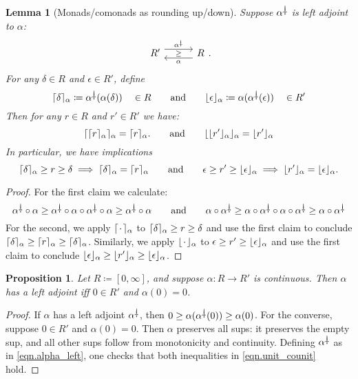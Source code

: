 \documentclass[11pt, one side, article]{memoir}
\newcommand{\adjpos}[6][30pt]{%
\begin{tikzcd}[ampersand replacement=\&, column sep=#1]
  #2\ar[r, shift left=4.5pt, "#3"]
  \ar[r, phantom, "\scriptstyle#6"]\&
  #5\ar[l, shift left=4.5pt, "#4"]
\end{tikzcd}
}
\theoremstyle{definition}
\theoremstyle{plain}
\newtheorem{proposition}[definitionx]{Proposition}
\newtheorem{lemma}[definitionx]{Lemma}
\DeclarePairedDelimiter{\floor}{\lfloor}{\rfloor}
\DeclarePairedDelimiter{\ceil}{\lceil}{\rceil}
\newcommand{\ldag}{^{\rotatebox{180}{$\dagger$}}}
\newcommand{\blank}[1][1pt]{\hspace{#1}\cdot\hspace{#1}}
\newcommand{\qqand}{\qquad\text{and}\qquad}
\newcommand{\flr}[2][\blank]{\floor{#1}_{#2}}
\newcommand{\clg}[2][\blank]{\ceil{#1}_{#2}}
\begin{document}
\begin{lemma}[Monads/comonads as rounding up/down]
Suppose $\alpha\ldag$ is left adjoint to $\alpha$:
\[
\adjpos{R'}{\alpha\ldag}{\alpha}{R}{\geq}.
\]
For any $\delta\in R$ and $\epsilon\in R'$, define
\[
	\clg[\delta]{\alpha}\coloneqq\alpha\ldag(\alpha(\delta))\quad\in R
	\qqand
	\flr[\epsilon]{\alpha}\coloneqq\alpha(\alpha\ldag(\epsilon))\quad\in R'
\]
 Then for any $r\in R$ and $r'\in R'$ we have:
\[
  \clg[{\clg[r]{\alpha}}]{\alpha}=\clg[r]{\alpha}.
  \qqand
  \flr[{\flr[r']{\alpha}}]{\alpha}=\flr[r']{\alpha}
\]
In particular, we have implications
 \[
 	\clg[\delta]{\alpha}\geq r\geq\delta
	\implies
 	\clg[\delta]{\alpha}
	=
	\clg[r]{\alpha}	
	\qqand
 	\epsilon\geq r'\geq\flr[\epsilon]{\alpha}
	\implies
	\flr[r']{\alpha}
	=
 	\flr[\epsilon]{\alpha}
	.\]
\end{lemma}
\begin{proof}
For the first claim we calculate:
\[
  \alpha\ldag\circ\alpha\geq
  \alpha\ldag\circ\alpha\circ\alpha\ldag\circ\alpha\geq
  \alpha\ldag\circ\alpha
  \qqand
  \alpha\circ\alpha\ldag\geq
  \alpha\circ\alpha\ldag\circ\alpha\circ\alpha\ldag\geq
  \alpha\circ\alpha\ldag
\]
For the second, we apply $\clg{\alpha}$ to $\clg[\delta]{\alpha}\geq r\geq\delta$ and use the first claim to conclude $\clg[\delta]{\alpha}\geq \clg[r]{\alpha}\geq\clg[\delta]{\alpha}$. Similarly, we apply $\flr{\alpha}$ to $\epsilon\geq r'\geq\flr[\epsilon]{\alpha}$ and use the first claim to conclude $\flr[\epsilon]{\alpha}\geq \flr[r']{\alpha}\geq\flr[\epsilon]{\alpha}$.
\end{proof}

\begin{proposition}\label{prop.cts_adjoint_close}
Let $R\coloneqq [0,\infty]$, and suppose $\alpha\colon R\to R'$ is continuous. Then $\alpha$ has a left adjoint iff $0\in R'$ and $\alpha(0)=0$.
\end{proposition}
\begin{proof}
	If $\alpha$ has a left adjoint $\alpha\ldag$, then $0\geq\alpha(\alpha\ldag(0))\geq\alpha(0)$. For the converse, suppose $0\in R'$ and $\alpha(0)=0$. Then $\alpha$ preserves all sups: it preserves the empty sup, and all other sups follow from monotonicity and continuity. Defining $\alpha\ldag$ as in \eqref{eqn.alpha_left}, one checks that both inequalities in \eqref{eqn.unit_counit} hold.
\end{proof}
\end{document}
